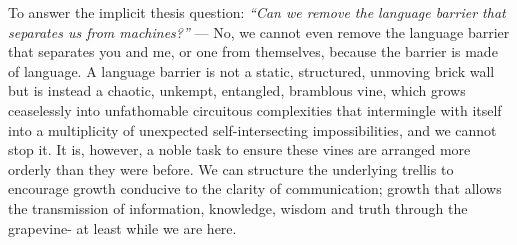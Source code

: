 

\newpage
To answer the implicit thesis question: \textit{``Can we remove the language barrier that separates us from machines?''} --- No, we cannot even remove the language barrier that separates you and me, or one from themselves, because the barrier is made of language. A language barrier is not a static, structured, unmoving brick wall but is instead a chaotic, unkempt, entangled, bramblous vine, which grows ceaselessly into unfathomable circuitous complexities that intermingle with itself into a multiplicity of unexpected self-intersecting impossibilities, and we cannot stop it. It is, however, a noble task to ensure these vines are arranged more orderly than they were before. We can structure the underlying trellis to encourage growth conducive to the clarity of communication; growth that allows the transmission of information, knowledge, wisdom and truth through the grapevine- at least while we are here.




















